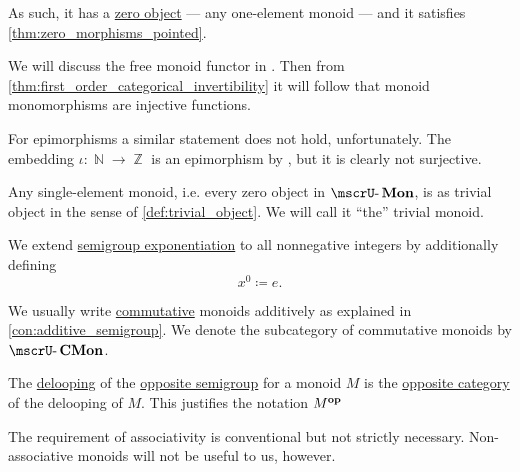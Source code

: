 \begin{definition}
\begin{thmenum}
    As such, it has a \hyperref[def:universal_objects/zero]{zero object} --- any one-element monoid --- and it satisfies \cref{thm:zero_morphisms_pointed}.

    We will discuss the free monoid functor in . Then from \cref{thm:first_order_categorical_invertibility} it will follow that monoid monomorphisms are injective functions.

    For epimorphisms a similar statement does not hold, unfortunately. The embedding \( \iota: \BbbN \to \BbbZ \) is an epimorphism by , but it is clearly not surjective.

    \mimprovised Any single-element monoid, i.e. every zero object in \( \ucat{Mon} \), is as trivial object in the sense of \cref{def:trivial_object}. We will call it \enquote{the} trivial monoid.

     We extend \hyperref[def:semigroup/exponentiation]{semigroup exponentiation} to all nonnegative integers by additionally defining
    \begin{equation*}
      x^0 \coloneqq e.
    \end{equation*}

     We usually write \hyperref[def:binary_operation/commutative]{commutative} monoids additively as explained in \cref{con:additive_semigroup}. We denote the subcategory of commutative monoids by \( \ucat{CMon} \).

    \mimprovised The \hyperref[def:monoid_delooping]{delooping} of the \hyperref[def:semigroup/opposite]{opposite semigroup} for a monoid \( M \) is the \hyperref[def:opposite_category]{opposite category} of the delooping of \( M \). This justifies the notation \( M^\oppos \)
  \end{thmenum}
\end{definition}
\begin{comments}
  \item The requirement of associativity is conventional but not strictly necessary. Non-associative monoids will not be useful to us, however.
\end{comments}

